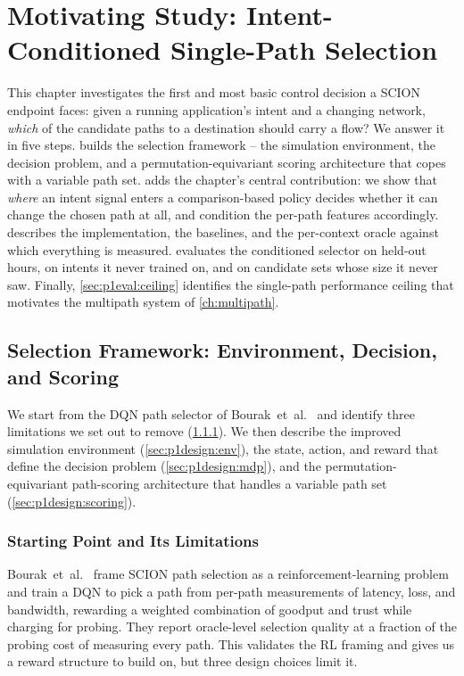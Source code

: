 \chapter{Motivating Study: Intent-Conditioned Single-Path Selection}
\label{ch:single_path}

This chapter investigates the first and most basic control decision a SCION endpoint faces: given a
running application's intent and a changing network, \emph{which} of the candidate paths to a destination
should carry a flow? We answer it in five steps.  builds the selection framework --
the simulation environment, the decision problem, and a permutation-equivariant scoring architecture that
copes with a variable path set.  adds the chapter's central contribution:
we show that \emph{where} an intent signal enters a comparison-based policy decides whether it can change
the chosen path at all, and condition the per-path features accordingly.  describes the
implementation, the baselines, and the per-context oracle against which everything is measured.
 evaluates the conditioned selector on held-out hours, on intents it never trained on,
and on candidate sets whose size it never saw. Finally, \cref{sec:p1eval:ceiling} identifies the
single-path performance ceiling that motivates the multipath system of \cref{ch:multipath}.

\section{Selection Framework: Environment, Decision, and Scoring}
\label{sec:sp:framework}

We start from the DQN path selector of Bourak~et~al.~\cite{Bourak2025} and identify three limitations we
set out to remove (\cref{sec:p1design:strawman}). We then describe the improved simulation environment
(\cref{sec:p1design:env}), the state, action, and reward that define the decision problem
(\cref{sec:p1design:mdp}), and the permutation-equivariant path-scoring architecture that handles a
variable path set (\cref{sec:p1design:scoring}).

\subsection{Starting Point and Its Limitations}
\label{sec:p1design:strawman}

Bourak~et~al.~\cite{Bourak2025} frame SCION path selection as a reinforcement-learning problem and
train a DQN to pick a path from per-path measurements of latency, loss, and bandwidth, rewarding a
weighted combination of goodput and trust while charging for probing. They report oracle-level
selection quality at a fraction of the probing cost of measuring every path. This validates the RL
framing and gives us a reward structure to build on, but three design choices limit it.

